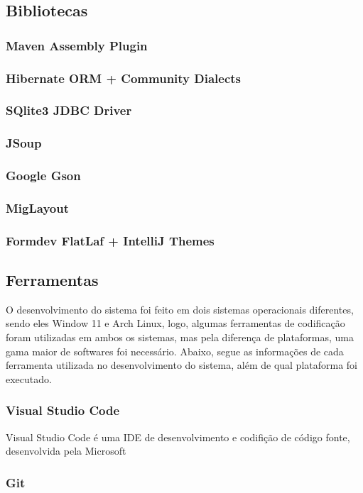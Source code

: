 \documentclass[a4paper,12pt]{article}
\begin{document}
\subsection{Bibliotecas}
\subsubsection{Maven Assembly Plugin}
\subsubsection{Hibernate ORM + Community Dialects}
\subsubsection{SQlite3 JDBC Driver}
\subsubsection{JSoup}
\subsubsection{Google Gson}
\subsubsection{MigLayout}
\subsubsection{Formdev FlatLaf + IntelliJ Themes}

\subsection{Ferramentas}
O desenvolvimento do sistema foi feito em dois sistemas operacionais diferentes, sendo eles Window 11 e Arch Linux, logo, algumas ferramentas 
de codificação foram utilizadas em ambos os sistemas, mas pela diferença de plataformas, uma gama maior de softwares foi necessário. Abaixo, segue 
as informações de cada ferramenta utilizada no desenvolvimento do sistema, além de qual plataforma foi executado.

\subsubsection{Visual Studio Code}
Visual Studio Code é uma IDE de desenvolvimento e codifição de código fonte, desenvolvida pela Microsoft

\subsubsection{Git}
\end{document}
